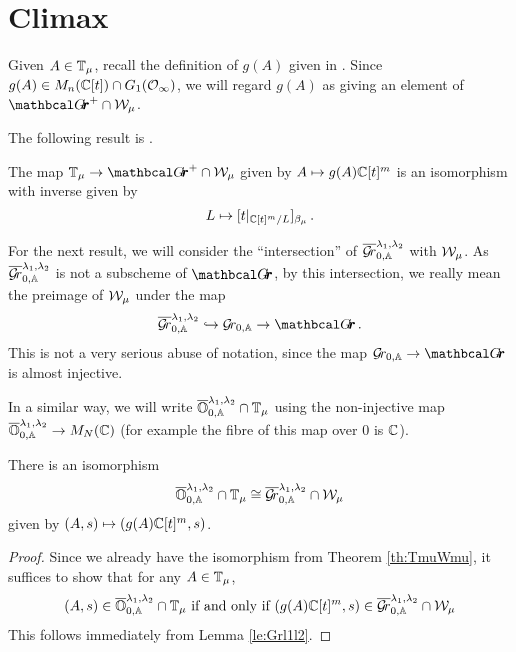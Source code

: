 \documentclass[draft]{article}
\begin{document}
\section{Climax}
Given $ A \in \mathbb T_\mu$, recall the definition of $ g(A)$ given in .
Since $ g(A) \in M_n(\mathbb C[t]) \cap G_1(\mathcal O_\infty)$, we will regard $ g(A)$ as giving an element of $ \Grth^+ \cap \cW_\mu$.

The following result is \cite[Theorem 3.2]{cautis2018categorical}.

\begin{theorem} \label{th:TmuWmu}
The map $ \TT_\mu \rightarrow \Grth^+ \cap \cW_\mu $ given by $ A \mapsto g(A)\mathbb C[t]^m $ is an isomorphism with inverse given by
$$ L \mapsto [t|_{\mathbb C[t]^m/L} ]_{\beta_\mu} \,. $$
\end{theorem}


For the next result, we will consider the ``intersection'' of $ \overline{\mathcal{G}\!r}^{\lambda_1, \lambda_2}_{0,\mathbb A} $ with $\mathcal W_\mu$.  
As $  \overline{\mathcal{G}\!r}^{\lambda_1, \lambda_2}_{0,\mathbb A} $ is not a subscheme of $ \Grth$, by this intersection, we really mean the preimage of $ \mathcal W_\mu$ under the map 
$$ 
\overline{\Gr}^{\lambda_1, \lambda_2}_{0,\AA}  \hookrightarrow \Grbd \rightarrow \Grth\,.
$$
This is not a very serious abuse of notation, since the map $ \Grbd \rightarrow \Grth $ is almost injective. 

In a similar way, we will write $ \overline{\mathbb O}^{\lambda_1, \lambda_2}_{0,\mathbb A} \cap \mathbb T_\mu$ using the non-injective map $ \overline{\mathbb O}^{\lambda_1, \lambda_2}_{0,\mathbb A} \rightarrow M_N(\mathbb C)$ (for example the fibre of this map over $ 0 $ is $ \mathbb C $). 

\begin{theorem} \label{th:OGrl}
    There is an isomorphism
    $$\overline{\mathbb O}^{\lambda_1, \lambda_2}_{0,\mathbb A} \cap \mathbb T_\mu \cong \overline{\mathcal{G}\!r}^{\lambda_1, \lambda_2}_{0,\mathbb A} \cap \mathcal W_\mu $$
    given by $ (A,s) \mapsto (g(A)\mathbb C[t]^m, s)$.
\end{theorem}
\begin{proof}
Since we already have the isomorphism from Theorem \ref{th:TmuWmu}, it suffices to show that for any $ A \in \mathbb T_\mu$, $$ (A,s) \in \overline{\mathbb O}^{\lambda_1, \lambda_2}_{0,\mathbb A} \cap \mathbb T_\mu \text{ if and only if } (g(A)\mathbb C[t]^m, s) \in \overline{\mathcal{G}\!r}^{\lambda_1, \lambda_2}_{0,\mathbb A} \cap \mathcal W_\mu $$
This follows immediately from Lemma \ref{le:Grl1l2}.
\end{proof}
\end{document}
